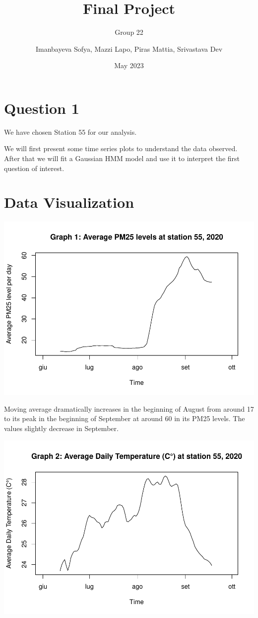 \documentclass[
]{article}
\title{Final Project \vspace{1in}}
\subtitle{Group 22 \vspace{1in}}
\author{Imanbayeva Sofya, Mazzi Lapo, Piras Mattia, Srivastava Dev
\vspace{1in}}
\date{May 2023 \vspace{1in}}
\begin{document}
\maketitle

\newpage

\newpage

\hypertarget{question-1}{%
\section{Question 1}\label{question-1}}

We have chosen Station 55 for our analysis.

We will first present some time series plots to understand the data
observed. After that we will fit a Gaussian HMM model and use it to
interpret the first question of interest.

\hypertarget{data-visualization}{%
\section{Data Visualization}\label{data-visualization}}

\begin{center}\includegraphics[width=0.75\linewidth,height=0.75\textheight]{finalproject_files/figure-latex/time series pm25-1} \end{center}

Moving average dramatically increases in the beginning of August from
around 17 to its peak in the beginning of September at around 60 in its
PM25 levels. The values slightly decrease in September.

\begin{center}\includegraphics[width=0.75\linewidth,height=0.75\textheight]{finalproject_files/figure-latex/ts temp-1} \end{center}
\end{document}
